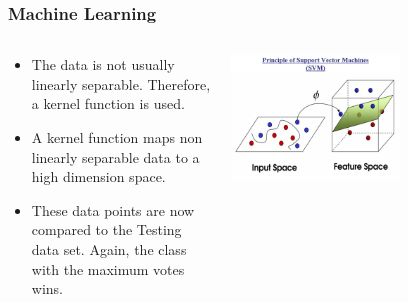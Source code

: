 \documentclass{beamer}
\begin{document}
\begin{frame}
\frametitle{Machine Learning}
 \begin{columns}
  \begin{column}{.6\textwidth}
  \begin{itemize}
  		\item The data is not usually linearly separable. Therefore, a kernel function is used.
		\item A kernel function maps non linearly separable data to a high dimension space. 
		\item These data points are now compared to the Testing data set. Again, the class with the maximum votes wins.
  \end{itemize}
  \end{column}
  \begin{column}{0.6\textwidth}
   \includegraphics[width=0.6\textwidth]{Illustrations/svm.jpg}
       \\
  \end{column}
  \end{columns}  
\end{frame}
\end{document}
